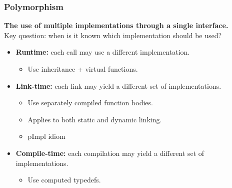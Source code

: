 \subsubsection{Polymorphism}
\textbf{The use of multiple implementations through a single interface.}\\
Key question: when is it known which implementation should be used?
\begin{itemize}
  \item \textbf{Runtime:} each call may use a different implementation.
  \begin{itemize}
    \item Use inheritance + virtual functions.
  \end{itemize}
  \item \textbf{Link-time:} each link may yield a different set of implementations.
  \begin{itemize}
    \item Use separately compiled function bodies.
    \item Applies to both static and dynamic linking.
    \item pImpl idiom
  \end{itemize}
  \item \textbf{Compile-time:} each compilation may yield a different set of implementations.
  \begin{itemize}
    \item Use computed typedefs.
  \end{itemize}
\end{itemize}


